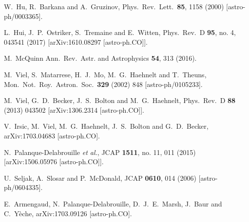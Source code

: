 \documentclass[11pt,nofootinbib]{article}
\numberwithin{equation}{section}
\begin{document}
\begin{thebibliography}{99}
  W.~Hu, R.~Barkana and A.~Gruzinov,
  Phys.\ Rev.\ Lett.\  {\bf 85}, 1158 (2000)
  [astro-ph/0003365].

  L.~Hui, J.~P.~Ostriker, S.~Tremaine and E.~Witten,
  Phys.\ Rev.\ D {\bf 95}, no. 4, 043541 (2017)
  [arXiv:1610.08297 [astro-ph.CO]].
	
M.~McQuinn
Ann.\ Rev.\ Astr. and Astrophysics {\bf 54}, 313 (2016).

  M.~Viel, S.~Matarrese, H.~J.~Mo, M.~G.~Haehnelt and T.~Theuns,
  Mon.\ Not.\ Roy.\ Astron.\ Soc.\  {\bf 329} (2002) 848
  [astro-ph/0105233].  
  
  M.~Viel, G.~D.~Becker, J.~S.~Bolton and M.~G.~Haehnelt,
  Phys.\ Rev.\ D {\bf 88} (2013) 043502
  [arXiv:1306.2314 [astro-ph.CO]].

  V.~Irsic, M.~Viel, M.~G.~Haehnelt, J.~S.~Bolton and G.~D.~Becker,
  arXiv:1703.04683 [astro-ph.CO].

  N.~Palanque-Delabrouille {\it et al.},
  JCAP {\bf 1511}, no. 11, 011 (2015)
  [arXiv:1506.05976 [astro-ph.CO]].
	
  U.~Seljak, A.~Slosar and P.~McDonald,
  JCAP {\bf 0610}, 014 (2006)
  [astro-ph/0604335].

  E.~Armengaud, N.~Palanque-Delabrouille, D.~J.~E.~Marsh, J.~Baur and C.~Yèche,
  arXiv:1703.09126 [astro-ph.CO].
	  

\end{thebibliography}
\end{document}
